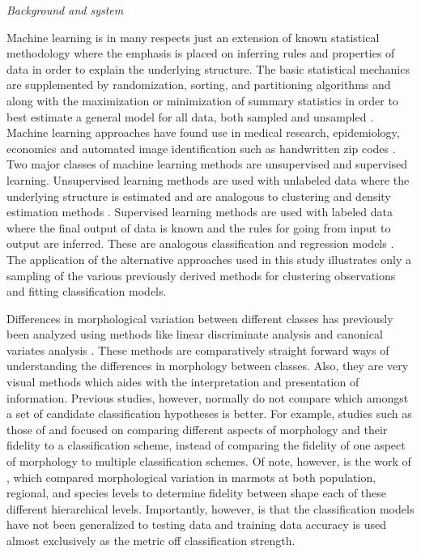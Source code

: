 \documentclass[12pt,letterpaper]{article}\usepackage{graphicx, color}
\renewcommand{\subsection}[1]{%
\bigskip
\begin{center}
\begin{large}
\normalfont\itshape #1
\end{large}
\end{center}}
\begin{document}
\subsection{Background and system}
Machine learning is in many respects just an extension of known statistical methodology \citep{Hastie2009} where the emphasis is placed on inferring rules and properties of data in order to explain the underlying structure. The basic statistical mechanics are supplemented by randomization, sorting, and partitioning algorithms and along with the maximization or minimization of summary statistics in order to best estimate a general model for all data, both sampled and unsampled \citep{Hastie2009}. Machine learning approaches have found use in medical research, epidemiology, economics and automated image identification such as handwritten zip codes \citep{Hastie2009}. Two major classes of machine learning methods are unsupervised and supervised learning. Unsupervised learning methods are used with unlabeled data where the underlying structure is estimated and are analogous to clustering and density estimation methods \citep{Kaufman1990}. Supervised learning methods are used with labeled data where the final output of data is known and the rules for going from input to output are inferred. These are analogous classification and regression models \citep{Breiman1984}. The application of the alternative approaches used in this study illustrates only a sampling of the various previously derived methods for clustering observations and fitting classification models. 

Differences in morphological variation between different classes has previously been analyzed using methods like linear discriminate analysis and canonical variates analysis \citep{Zelditch2004,Mitteroecker2011,Polly2007a,Polly2003,Gunduz2007,Gaubert2005b,Demandt2009}. These methods are comparatively straight forward ways of understanding the differences in morphology between classes. Also, they are very visual methods which aides with the interpretation and presentation of information. Previous studies, however, normally do not compare which amongst a set of candidate classification hypotheses is better. For example, studies such as those of \citet{Caumul2005a} and \citet{Polly2007a} focused on comparing different aspects of morphology and their fidelity to a classification scheme, instead of comparing the fidelity of one aspect of morphology to multiple classification schemes. Of note, however, is the work of \citet{Cardini2009a}, which compared morphological variation in marmots at both population, regional, and species levels to determine fidelity between shape each of these different hierarchical levels. Importantly, however, is that the classification models have not been generalized to testing data and training data accuracy is used almost exclusively as the metric off classification strength.
\end{document}
